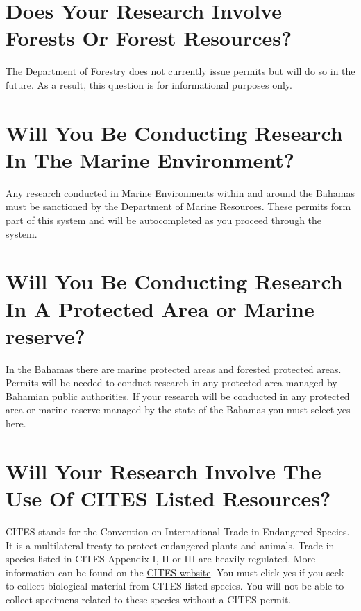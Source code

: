 \documentclass[
]{book}
\begin{document}
\hypertarget{does-your-research-involve-forests-or-forest-resources}{%
\section{Does Your Research Involve Forests Or Forest Resources?}\label{does-your-research-involve-forests-or-forest-resources}}

The Department of Forestry does not currently issue permits but will do so in the future. As a result, this question is for informational purposes only.

\hypertarget{will-you-be-conducting-research-in-the-marine-environment}{%
\section{Will You Be Conducting Research In The Marine Environment?}\label{will-you-be-conducting-research-in-the-marine-environment}}

Any research conducted in Marine Environments within and around the Bahamas must be sanctioned by the Department of Marine Resources. These permits form part of this system and will be autocompleted as you proceed through the system.

\hypertarget{will-you-be-conducting-research-in-a-protected-area-or-marine-reserve}{%
\section{Will You Be Conducting Research In A Protected Area or Marine reserve?}\label{will-you-be-conducting-research-in-a-protected-area-or-marine-reserve}}

In the Bahamas there are marine protected areas and forested protected areas. Permits will be needed to conduct research in any protected area managed by Bahamian public authorities. If your research will be conducted in any protected area or marine reserve managed by the state of the Bahamas you must select yes here.

\hypertarget{will-your-research-involve-the-use-of-cites-listed-resources}{%
\section{Will Your Research Involve The Use Of CITES Listed Resources?}\label{will-your-research-involve-the-use-of-cites-listed-resources}}

CITES stands for the Convention on International Trade in Endangered Species. It is a multilateral treaty to protect endangered plants and animals. Trade in species listed in CITES Appendix I, II or III are heavily regulated. More information can be found on the \href{https://cites.org/}{CITES website}. You must click yes if you seek to collect biological material from CITES listed species. You will not be able to collect specimens related to these species without a CITES permit.
\end{document}

